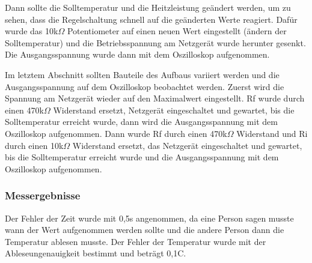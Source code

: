 \documentclass[12pt,a4paper]{article}
\begin{document}
Dann sollte die Solltemperatur und die Heitzleistung geändert werden, um zu sehen, dass die Regelschaltung schnell auf die geänderten Werte reagiert. Dafür wurde das 10k$\Omega$ Potentiometer auf einen neuen Wert eingestellt (ändern der Solltemperatur) und die Betriebsspannung am Netzgerät wurde herunter gesenkt. Die Ausgangsspannung wurde dann mit dem Oszilloskop aufgenommen.

Im letztem Abschnitt sollten Bauteile des Aufbaus variiert werden und die Ausgangsspannung auf dem Oszilloskop beobachtet werden. Zuerst wird die Spannung am Netzgerät wieder auf den Maximalwert eingestellt. Rf wurde durch einen 470k$\Omega$ Widerstand ersetzt, Netzgerät eingeschaltet und gewartet, bis die Solltemperatur erreicht wurde, dann wird die Ausgangsspannung mit dem Oszilloskop aufgenommen. Dann wurde Rf durch einen 470k$\Omega$ Widerstand und Ri durch einen 10k$\Omega$ Widerstand ersetzt, das Netzgerät eingeschaltet und gewartet, bis die Solltemperatur erreicht wurde und die Ausgangsspannung mit dem Oszilloskop aufgenommen.

\subsubsection*{Messergebnisse}

Der Fehler der Zeit wurde mit 0,5s angenommen, da eine Person sagen musste wann der Wert aufgenommen werden sollte und die andere Person dann die Temperatur ablesen musste. Der Fehler der Temperatur wurde mit der Ableseungenauigkeit bestimmt und beträgt 0,1C.
\end{document}
